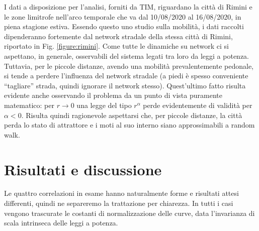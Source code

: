 \documentclass[12pt,a4paper]{article}
\begin{document}
I dati a disposizione per l'analisi, forniti da TIM, riguardano la città di Rimini e le zone limitrofe nell'arco temporale che va dal 10/08/2020 al 16/08/2020, in piena stagione estiva.
Essendo questo uno studio sulla mobilità, i dati raccolti dipenderanno fortemente dal network stradale della stessa città di Rimini, riportato in Fig. \ref{figure:rimini}.
Come tutte le dinamiche su network ci si aspettano, in generale, osservabili del sistema legati tra loro da leggi a potenza.
Tuttavia, per le piccole distanze, avendo una mobilità prevalentemente pedonale, si tende a perdere l'influenza del network stradale (a piedi è spesso conveniente ``tagliare'' strada, quindi ignorare il network stesso).
Quest'ultimo fatto risulta evidente anche osservando il problema da un punto di vista puramente matematico: per $r\to 0$ una legge del tipo $r^\alpha$ perde evidentemente di validità per $\alpha<0$.
Risulta quindi ragionevole aspettarsi che, per piccole distanze, la città perda lo stato di attrattore e i moti al suo interno siano approssimabili a random walk.
\section{Risultati e discussione}
Le quattro correlazioni in esame hanno naturalmente forme e risultati attesi differenti, quindi ne separeremo la trattazione per chiarezza.
In tutti i casi vengono trascurate le costanti di normalizzazione delle curve, data l'invarianza di scala intrinseca delle leggi a potenza.
\end{document}

